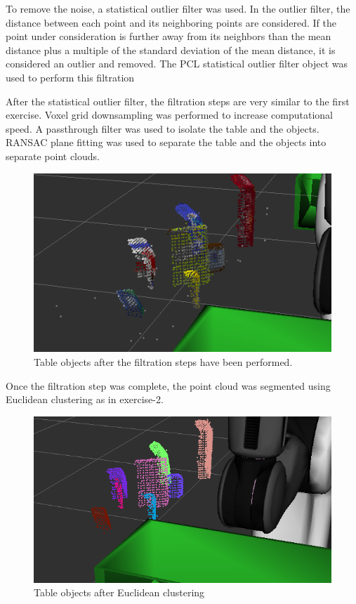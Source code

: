 \documentclass{article}
\begin{document}
To remove the noise, a statistical outlier filter was used. In the outlier filter, the distance between each point and its neighboring points are considered. If the point under consideration is further away from its neighbors than the mean distance plus a multiple of the standard deviation of the mean distance, it is considered an outlier and removed. The PCL statistical outlier filter object was used to perform this filtration

After the statistical outlier filter, the filtration steps are very similar to the first exercise. Voxel grid downsampling was performed to increase computational speed. A passthrough filter was used to isolate the table and the objects. RANSAC plane fitting was used to separate the table and the objects into separate point clouds.

\begin{figure}[H]
    \includegraphics[width=\linewidth]{pr2objects.png}
    \caption{Table objects after the filtration steps have been performed.}
    \label{fig:pr2objects}
\end{figure}

Once the filtration step was complete, the point cloud was segmented using Euclidean clustering as in exercise-2.

\begin{figure}[H]
    \includegraphics[width=\linewidth]{pr2cluster.png}
    \caption{Table objects after Euclidean clustering}
    \label{fig:pr2cluster}
\end{figure}
\end{document}

